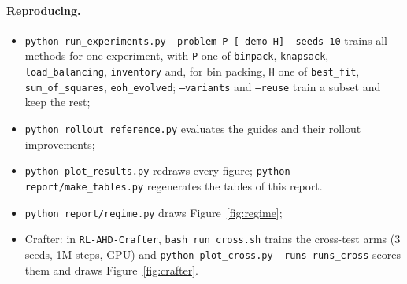 \documentclass[11pt,a4paper]{article}
\begin{document}
\paragraph{Reproducing.}
\begin{itemize}[leftmargin=*]
\item \texttt{python run\_experiments.py --problem P [--demo H] --seeds 10} trains all methods for one experiment,
  with \texttt{P} one of \texttt{binpack}, \texttt{knapsack}, \texttt{load\_balancing}, \texttt{inventory} and, for
  bin packing, \texttt{H} one of \texttt{best\_fit}, \texttt{sum\_of\_squares}, \texttt{eoh\_evolved};
  \texttt{--variants} and \texttt{--reuse} train a subset and keep the rest;
\item \texttt{python rollout\_reference.py} evaluates the guides and their rollout improvements;
\item \texttt{python plot\_results.py} redraws every figure; \texttt{python report/make\_tables.py} regenerates the
  tables of this report.
\item \texttt{python report/regime.py} draws Figure~\ref{fig:regime};
\item Crafter: in \texttt{RL-AHD-Crafter}, \texttt{bash run\_cross.sh} trains the cross-test arms (3 seeds, 1M steps,
  GPU) and \texttt{python plot\_cross.py --runs runs\_cross} scores them and draws Figure~\ref{fig:crafter}.
\end{itemize}
\end{document}
